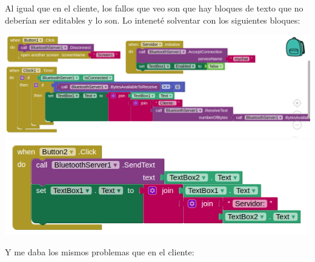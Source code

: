 \documentclass{article}
\begin{document}
Al igual que en el cliente, los fallos que veo son que hay bloques de texto que no deberían ser editables y lo son. Lo inteneté solventar con los siguientes bloques:

\begin{flushleft}
	\includegraphics[scale=0.4]{imagenes/Servidor_1.png} 
	\includegraphics[scale=0.4]{imagenes/Servidor_2.png} 
\end{flushleft}

Y me daba los mismos problemas que en el cliente:
\end{document}
